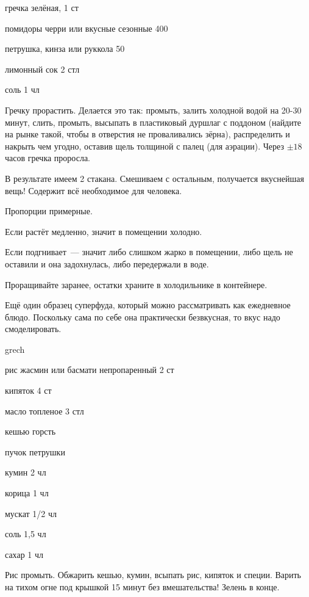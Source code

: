 {
\item гречка зелёная, 1 ст
\item помидоры черри или вкусные сезонные 400
\item петрушка, кинза или руккола 50
}{
\item лимонный сок 2 стл
\item соль 1 чл
}{
Гречку прорастить. Делается это так: промыть, залить холодной водой на 20-30 минут, слить, промыть, высыпать в пластиковый дуршлаг с поддоном (найдите на рынке такой, чтобы в отверстия не проваливались зёрна), распределить и накрыть чем угодно, оставив щель толщиной с палец (для аэрации). Через $\pm18$ часов гречка проросла.

В результате имеем 2 стакана. Смешиваем с остальным, получается вкуснейшая вещь! Содержит всё необходимое для человека.
}{
\begin{advice}
    \item Пропорции примерные.
\item Если растёт медленно, значит в помещении холодно.
    \item Если подгнивает~--- значит либо слишком жарко в помещении, либо щель не оставили и она задохнулась, либо передержали в воде.
\item Проращивайте заранее, остатки храните в холодильнике в контейнере.
    \item Ещё один образец суперфуда, который можно рассматривать как ежедневное блюдо. Поскольку сама по себе она практически безвкусная, то вкус надо смоделировать.
\end{advice}}{grech}



{
\item рис жасмин или басмати непропаренный 2 ст
\item кипяток 4 ст
\item масло топленое 3 стл
\item кешью горсть
\item пучок петрушки
}{
\item кумин 2 чл
\item корица 1 чл
\item мускат 1/2 чл
\item соль 1,5 чл
\item сахар 1 чл
}{
Рис промыть. Обжарить кешью, кумин, всыпать рис, кипяток и специи. Варить на тихом огне под крышкой 15 минут без вмешательства! Зелень в конце.
}{}{}



